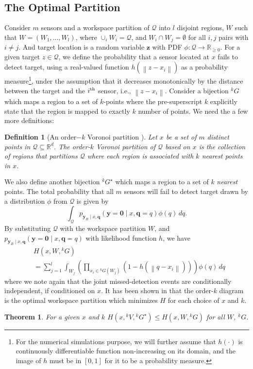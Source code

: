 \documentclass[journal]{IEEEtran}
\newtheorem{definition}{Definition}[section]
\newtheorem{theorem}{Theorem}[section]
\begin{document}
\subsection{The Optimal Partition}



Consider $m$ sensors and a workspace partition of $\mathcal{Q}$ into $l$ disjoint regions, $W$ such that
$W = (W_1,\dots,W_l)$, where $\cup_i W_i = \mathcal{Q}$, and $W_i \cap W_j = \emptyset$ for all $i,j$ pairs with $i \neq j$. And target location is a random variable $\bm{z}$ with PDF $\phi:\mathcal{Q} \rightarrow \mathbb{R}_{\geq 0}$.
For a given target $z \in \mathcal{Q}$, we define the probability that a sensor located at $x$ fails to detect target, using a real-valued function $h(\left\|z - x_i\right\|)$ as a probability measure\footnote{For the numerical simulations purpose, we will further assume that $h(\cdot)$ is continuously differentiable function non-increasing on its domain, and the image of $h$ must be in $[0,1]$ for it to be a probability measure.}, under the assumption that it decreases monotonically by the distance between the target and the $i^{\textup{th}}$ sensor, i.e., $\left\| z- x_i\right\|$. 
Consider a bijection ${}^kG$ which maps a region to a set of $k$-points where the pre-superscript $k$ explicitly state that the region is mapped to exactly $k$ number of points.
We need the a few more definitions:
\begin{definition}[An order$-k$ Voronoi partition \cite{shamos1975closest}]
	Let $x$ be a set of $m$ distinct points in $\mathcal{Q}\subseteq \mathbb{R}^d$. The order-$k$ Voronoi partition of $\mathcal{Q}$ based on $x$ is the collection of regions that partitions $\mathcal{Q}$ where each region is associated with $k$ nearest points in $x$.
	\label{orderk}
\end{definition}
We also define another bijection ${}^kG^{\star}$ which maps a region to a set of $k$ \emph{nearest} points. The total probability that all $m$ sensors will fail to detect target drawn by a distribution $\phi$ from $\mathcal{Q}$ is given by
\[
\int_{\mathcal{Q}} p_{\bm{y}_{B} \mid x,\bm{q}
}\left(\bm{y} = \mathbf{0} \mid x,\bm{q}=q
\right)\phi(q)\,{dq}.
\]
By substituting $\mathcal{Q}$ with the workspace partition $W$, and $p_{\bm{y}_{B} \mid x,\bm{q}
}\left(\bm{y} = \mathbf{0} \mid x,\bm{q}=q
\right)$ with likelihood function $h$, we have
\begin{align}
&H(x,W,{}^kG) \nonumber \\
&= \sum_{j = 1}^l \int_{W_j} \left( \prod_{x_i \in {}^kG(W_j)} \left(1- h \left(\left\|
q - x_i \right\|  \right) \right) \right)\phi(q)\,dq
\label{cost2}
\end{align}
where we note again that the joint missed-detection events are conditionally independent, if conditioned on $x$.
It has been shown in \cite{park2014robust} that the order-$k$ diagram is the optimal workspace partition which minimizes $H$ for each choice of $x$ and $k$.
\begin{theorem}
	For a given $x$ and $k$
	$
	H(x,{}^{k}V,{}^kG^{\star}) \leq H(x,W,{}^{k}G)
	$
	for all $W$, ${}^{k}G$.
\end{theorem}
\end{document}
